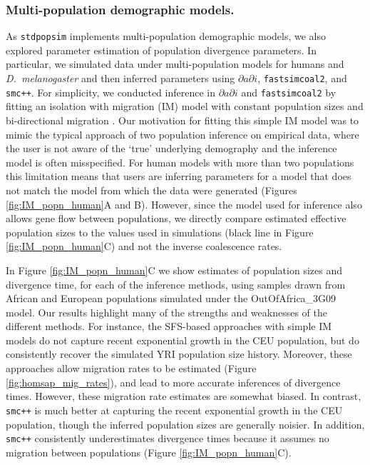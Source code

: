 \documentclass[12pt,halfline,a4paper]{ouparticle}
\newcommand{\stdpopsim}{\texttt{stdpopsim}\xspace}
\newcommand{\dadi}{$\partial a \partial i$\xspace}
\newcommand{\smcpp}{\texttt{smc++}\xspace}
\newcommand{\fastsimcoal}{\texttt{fastsimcoal2}\xspace}
\begin{document}
\subsubsection*{Multi-population demographic models.}
As \stdpopsim implements multi-population demographic models, we also
explored parameter estimation of population divergence parameters. In particular,
we simulated data under multi-population models for humans and \textit{D.~melanogaster}
and then inferred  parameters using \dadi, \fastsimcoal, and \smcpp.
For simplicity, we conducted inference in \dadi and \fastsimcoal by fitting an isolation with migration (IM) model
with constant population sizes and bi-directional migration \citep{hey2004im}.
Our motivation for fitting this simple
IM model was to mimic the typical approach of two population inference on empirical
data, where the user is not aware of the `true' underlying demography and the inference
model is often misspecified.
For human models with more than two populations \citep[e.g.,][]{gutenkunst2009inferring}
this limitation means that users are inferring parameters for a model that does
not match the model from which the data were generated (Figures
\ref{fig:IM_popn_human}A and B). However, since the model used for inference also
allows gene flow between populations, we directly compare estimated effective population sizes
to the values used in simulations (black line in Figure \ref{fig:IM_popn_human}C)
and not the inverse coalescence rates.

In Figure \ref{fig:IM_popn_human}C we show estimates of population sizes and divergence
time, for each of the inference methods, using samples drawn from African and European populations
simulated under the OutOfAfrica\_3G09 model. Our results highlight many
of the strengths and weaknesses of the different methods.
For instance, the SFS-based approaches with simple IM models do not capture
recent exponential growth in the CEU population, but do consistently recover the
simulated YRI population size history. Moreover, these approaches allow 
migration rates to be estimated (Figure \ref{fig:homsap_mig_rates}), and lead to more accurate inferences
of divergence times. However, these migration rate estimates are somewhat biased.
In contrast, \smcpp is much better at capturing the recent exponential
growth in the CEU population, though the inferred population sizes are generally noisier.
In addition, \smcpp consistently underestimates divergence times
because it assumes no migration between populations (Figure \ref{fig:IM_popn_human}C).
\end{document}
